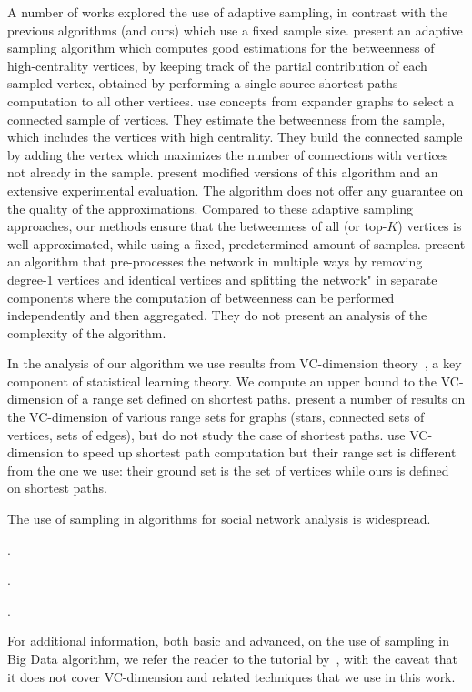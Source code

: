 A number of works explored
the use of adaptive sampling, in contrast with the previous algorithms (and
ours) which use a fixed sample size. \citet{BaderKMM07} present an adaptive
sampling algorithm which computes good estimations for the betweenness of
high-centrality vertices, by keeping track of the partial contribution of each
sampled vertex, obtained by performing a single-source shortest paths
computation to all other vertices. \citet{MaiyaBW10} use concepts from expander
graphs to select a connected sample of vertices. They estimate the betweenness
from the sample, which includes the vertices with high centrality. They build
the connected sample by adding the vertex which maximizes the number of
connections with vertices not already in the sample. \citet{LimMRTB11} present
modified versions of this algorithm and an extensive experimental evaluation.
The algorithm does not offer any guarantee on the quality of the approximations.
Compared to these adaptive sampling approaches, our methods ensure that the
betweenness of all (or top-$K$) vertices is well approximated, while using a
fixed, predetermined amount of samples.  \citet{SaryuceSKC13} present an
algorithm that pre-processes the network in multiple ways by removing degree-1
vertices and identical vertices and splitting the network" in separate
components where the computation of betweenness can be performed independently
and then aggregated. They do not present an analysis of the complexity of the
algorithm. 

In the analysis of our algorithm we use results from VC-dimension
theory~\citep{VapnikC71}, a key component of statistical learning theory. We
compute an upper bound to the VC-dimension of a range set defined on shortest
paths. \citet{KranakisKRUW97} present a number of results on the VC-dimension of
various range sets for graphs (stars, connected sets of vertices, sets of
edges), but do not study the case of shortest paths. \citet{AbrahamDFGW11} use
VC-dimension to speed up shortest path computation but their range set is
different from the one we use: their ground set is the set of vertices while
ours is defined on shortest paths.

The use of sampling in algorithms for social network analysis is widespread.

\citet{PapagelisDK13}.

\citet{TangZCZS15}.

\citet{UganderKBK13}.

For additional information, both basic and advanced, on the use of sampling in
Big Data algorithm, we refer the reader to the tutorial by~\citet{CormodeD14},
with the caveat that it does not cover VC-dimension and related techniques that
we use in this work.

